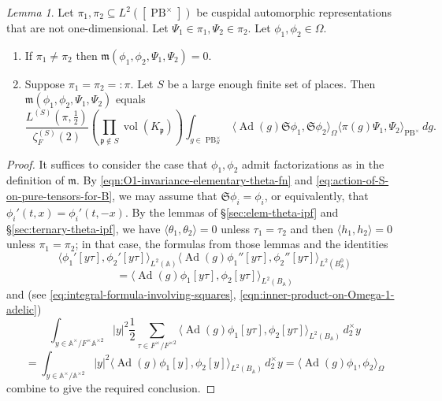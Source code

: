 \documentclass[reqno,10pt]{amsart}
\theoremstyle{plain} %
\theoremstyle{definition}
\theoremstyle{plain} %
\theoremstyle{remark}
\theoremstyle{itplain} %
\newtheorem*{lemma*}{Lemma}
\theoremstyle{remark} %
\numberwithin{equation}{section}
\DeclareMathOperator{\Ad}{Ad}
\def\PB{\operatorname{PB}}
\DeclareMathOperator{\vol}{vol}
\begin{document}
\begin{lemma*}
  Let $\pi_1, \pi_2 \subseteq L^2([\PB^\times])$ be cuspidal automorphic representations that are not one-dimensional.  Let $\Psi_1 \in \pi_1, \Psi_2 \in \pi_2$.  Let $\phi_1, \phi_2 \in \Omega$.
  \begin{enumerate}
  \item If $\pi_1 \neq \pi_2$ then $\mathfrak{m}(\phi_1,\phi_2,\Psi_1,\Psi_2) = 0$.
  \item Suppose $\pi_1 = \pi_2 =: \pi$.  Let $S$ be a large enough finite set of places.
    Then $\mathfrak{m}(\phi_1,\phi_2,\Psi_1,\Psi_2)$ equals
    \begin{equation*}
      \frac{L^{(S)}(\pi,\tfrac{1}{2})}{\zeta_F^{(S)}(2)} \left(\prod_{\mathfrak{p} \notin S} \vol(K_\mathfrak{p}) \right) \int_{g \in \PB^\times_S} \langle \Ad(g) \mathfrak{S} \phi_1, \mathfrak{S} \phi_2 \rangle_{\Omega} \langle \pi(g) \Psi_1, \Psi_2 \rangle_{\PB^\times} \,d g.
    \end{equation*}
  \end{enumerate}
\end{lemma*}
\begin{proof}
  It suffices to consider the case that $\phi_1, \phi_2$ admit factorizations as in the definition of $\mathfrak{m}$.  By \eqref{eqn:O1-invariance-elementary-theta-fn} and \eqref{eq:action-of-S-on-pure-tensors-for-B}, we may assume that $\mathfrak{S} \phi_i = \phi_i$, or equivalently, that $\phi_i'(t,x) = \phi_i'(t,-x)$.  By the lemmas of \S\ref{sec:elem-theta-ipf} and \S\ref{sec:ternary-theta-ipf}, we have $\langle \theta_1, \theta_2 \rangle = 0$ unless $\tau_1 = \tau_2$ and then $\langle h_1, h_2 \rangle = 0$ unless $\pi_1 = \pi_2$; in that case, the formulas from those lemmas and the identities
  \[
    \langle \phi_1'[y \tau], \phi_2'[y \tau] \rangle_{L^2(\mathbb{A})} \langle \Ad(g) \phi_1''[y \tau], \phi_2''[y \tau] \rangle_{L^2(B_\mathbb{A}^0)}
  \]
  \[
    = \langle \Ad(g) \phi_1[y \tau], \phi_2[y \tau] \rangle_{L^2(B_\mathbb{A})}
  \]
  and (see \eqref{eq:integral-formula-involving-squares}, \eqref{eqn:inner-product-on-Omega-1-adelic})
  \begin{equation}
    \int_{y \in \mathbb{A}^{\times} / F^\times \mathbb{A}^{\times 2} } |y|^2 \frac{1}{2} \sum_{\tau \in F^\times / F^{\times 2}} \langle \Ad(g) \phi_1[y \tau], \phi_2[y \tau] \rangle_{L^2(B_\mathbb{A})} \, d_2^\times y
  \end{equation}
  \[
    = \int_{y \in \mathbb{A}^{\times} / \mathbb{A}^{\times 2} } |y|^2 \langle \Ad(g) \phi_1[y], \phi_2[y] \rangle_{L^2(B_\mathbb{A})} \, d_2^\times y = \langle \Ad(g) \phi_1, \phi_2 \rangle_{\Omega}
  \]
  combine to give the required conclusion.
\end{proof}
\end{document}
